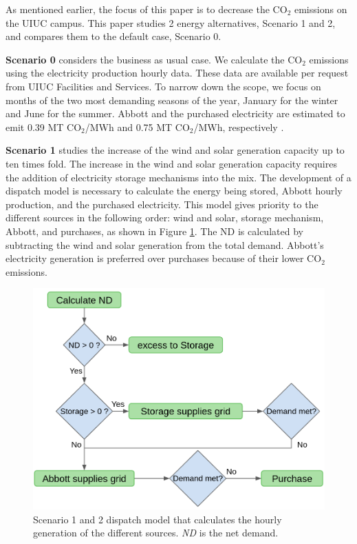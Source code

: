 \documentclass{anstrans}
\begin{document}
As mentioned earlier, the focus of this paper is to decrease the CO$_2$ emissions on the UIUC campus.
This paper studies 2 energy alternatives, Scenario 1 and 2, and compares them to the default case, Scenario 0.

\textbf{Scenario 0} considers the business as usual case.
We calculate the CO$_2$ emissions using the electricity production hourly data.
These data are available per request from UIUC Facilities and Services.
To narrow down the scope, we focus on months of the two most demanding seasons of the year, January for the winter and June for the summer.
Abbott and the purchased electricity are estimated to emit 0.39 MT CO$_2$/MWh and 0.75 MT CO$_2$/MWh, respectively \cite{isee_illinois_2015, isee_illinois_2020}.

\textbf{Scenario 1} studies the increase of the wind and solar generation capacity up to ten times fold.
The increase in the wind and solar generation capacity requires the addition of electricity storage mechanisms into the mix.
The development of a dispatch model is necessary to calculate the energy being stored, Abbott hourly production, and the purchased electricity.
This model gives priority to the different sources in the following order: wind and solar, storage mechanism, Abbott, and purchases, as shown in Figure \ref{fig:dispatch-model}.
The \gls{ND} is calculated by subtracting the wind and solar generation from the total demand.
Abbott’s electricity generation is preferred over purchases because of their lower CO$_2$ emissions.

\begin{figure}[htbp!] %
    \centering
    \includegraphics[width=0.90\linewidth]{figures/dispatch-model}
    \hfill
    \caption{Scenario 1 and 2 dispatch model that calculates the hourly generation of the different sources. \textit{ND} is the net demand.}
    \label{fig:dispatch-model}
\end{figure}
\end{document}
